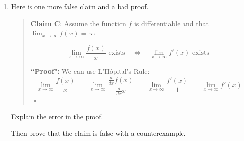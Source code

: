 \documentclass[12pt]{exam}
\newcommand {\DS} [1] {${\displaystyle #1}$}
\begin{document}
\begin{enumerate}
\begin{enumerate}
		\item  Here is one more false claim and a bad proof.
			\begin{quotation}
				\noindent
				{\bf Claim C:} Assume the function $f$ is differentiable and that \DS{\lim_{x \to \infty} f(x) = \infty}.
				
				$$  \lim_{x \to \infty} \frac{f(x)}{x} \mbox{ exists} \quad \iff \quad \lim_{x \to \infty} f'(x) \mbox{ exists } $$
				
				
				\noindent
				{\bf ``Proof":}  We can use L'H\^{o}pital's Rule:
					$$
						\lim_{x \to \infty} \frac{f(x)}{x} \; = \; \lim_{x \to \infty} \frac{\frac{d}{dx} f(x)}{\frac{d}{dx} x} 
							\; = \; \lim_{x \to \infty} \frac{f'(x)}{1} \; = \; \lim_{x \to \infty} f'(x)
					$$
					\ \hfill $\square$
			\end{quotation}
			Explain the  error in the proof.
			
			Then prove that the claim is false with a counterexample.
	\end{enumerate}

\end{enumerate}
\end{document}
